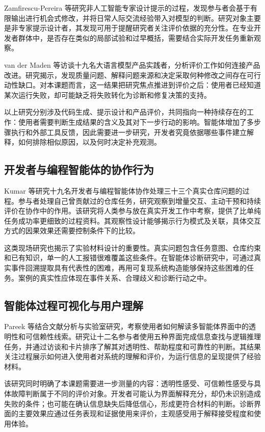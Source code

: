 Zamfirescu-Pereira 等\cite{ref65}研究非人工智能专家设计提示的过程，发现参与者会基于有限输出进行机会式修改，并将日常人际交流经验带入对模型的判断。研究对象主要是非专家提示设计者，其发现可用于提醒研究者关注评价依据的充分性。在专业开发者群体中，是否存在类似的局部试验和过早概括，需要结合实际开发任务重新观察。

van der Maden 等\cite{ref01}访谈十九名大语言模型产品实践者，分析评价工作如何连接产品改进。研究揭示，发现质量问题、解释问题来源和决定采取何种修改之间存在可行动性缺口。对本课题而言，这一结果把研究焦点推进到评价之后：使用者已经知道某次运行失败，却可能缺乏将失败转化为诊断和修复决策的支持。

以上研究分别涉及代码生成、提示设计和产品评价，共同指向一种持续存在的工作：使用者需要判断生成结果的含义及其对下一步行动的影响。智能体增加了多步骤执行和外部工具反馈，因此需要进一步研究，开发者究竟依据哪些事件建立解释，如何排除相似原因，以及何时决定补充观测。

\subsection{开发者与编程智能体的协作行为}

Kumar 等\cite{ref59}研究十九名开发者与编程智能体协作处理三十三个真实仓库问题的过程。参与者处理自己曾贡献过的仓库任务，研究观察到增量交互、主动干预和持续评价在协作中的作用。该研究将人类参与放在真实开发工作中考察，提供了比单纯任务成功率更细致的过程资料。其观察性设计能够揭示行为模式及关联，具体交互方式的因果效果还需要控制条件下的比较。

这类现场研究也揭示了实验材料设计的重要性。真实问题包含任务意图、仓库约束和已有知识，单一的人工报错很难覆盖这些条件。在智能体诊断研究中，可通过真实事件回溯提取具有代表性的困难，再用可复现系统构造能够保持这些困难的任务。案例的真实性应体现在事件关系、合理歧义和诊断行动之中。

\subsection{智能体过程可视化与用户理解}

Pareek 等\cite{ref58}结合文献分析与实验室研究，考察使用者如何解读多智能体界面中的透明性和可信赖性线索。研究让十二名参与者使用五种界面完成信息查找与逻辑推理任务，并通过访谈和卡片排序了解其对透明性、帮助程度和可靠性的判断。其结果关注过程展示如何进入使用者对系统的理解和评价，为运行信息的呈现提供了经验材料。

该研究同时明确了本课题需要进一步测量的内容：透明性感受、可信赖性感受与具体故障判断属于不同的评价对象。开发者可能认为界面解释充分，却仍未识别造成失败的条件；也可能在确认信息缺失后降低信心，形成更符合材料的判断。诊断界面的主要效果应通过任务表现和证据使用来评价，主观感受用于解释接受程度和使用体验。


